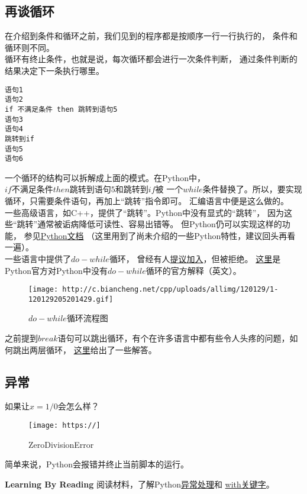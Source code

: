 \subsection{再谈循环}
在介绍到条件和循环之前，我们见到的程序都是按顺序一行一行执行的，
条件和循环则不同。\\
循环有终止条件，也就是说，每次循环都会进行一次条件判断，
通过条件判断的结果决定下一条执行哪里。
\begin{lstlisting}[style=PythonStyle1, caption=Rectangle]
语句1
语句2
if 不满足条件 then 跳转到语句5
语句3
语句4
跳转到if
语句5
语句6
\end{lstlisting}
一个循环的结构可以拆解成上面的模式。在Python中，$if 不满足条件 then 跳转到语句5$和$跳转到if$被
一个$while 条件$替换了。所以，要实现循环，只需要条件语句，再加上“跳转”指令即可。
汇编语言中便是这么做的。\\
一些高级语言，如C++，提供了“跳转”。Python中没有显式的“跳转”，
因为这些“跳转”通常被诟病降低可读性、容易出错等。
但Python仍可以实现这样的功能，
参见\href{http://python.usyiyi.cn/documents/python_352/faq/design.html#yiyi-247}{Python文档}
（这里用到了尚未介绍的一些Python特性，建议回头再看一遍）。\\
一些语言中提供了$do-while$循环，
曾经有人\href{https://www.python.org/dev/peps/pep-0315/}{提议加入}，但被拒绝。
\href{https://mail.python.org/pipermail/python-ideas/2013-June/021610.html}{这里}是Python官方对Python中没有$do-while$循环的官方解释（英文）。
\begin{figure}[htbp]
\centering\texttt{[image: http://c.biancheng.net/cpp/uploads/allimg/120129/1-120129205201429.gif]}\\
\caption{$do-while$循环流程图}\label{do.while}
\end{figure}
之前提到$break$语句可以跳出循环，有个在许多语言中都有些令人头疼的问题，如何跳出两层循环，
\href{https://www.zhihu.com/question/37076998}{这里}给出了一些解答。
\subsection{异常}
如果让$x = 1 / 0$会怎么样？\\
\begin{figure}[htbp]
\centering\texttt{[image: https://]}\\
\caption{ZeroDivisionError}\label{do.while}
\end{figure}
简单来说，Python会报错并终止当前脚本的运行。
\begin{paperbox}{\textbf{Learning By Reading}\starfour}
阅读材料，了解Python\href{http://blog.sciencenet.cn/blog-3031432-1059523.html}{异常处理}和
\href{http://yuez.me/python-zhong-de-guan-jian-zi-with-xiang-jie/}{with关键字}。
\end{paperbox}
